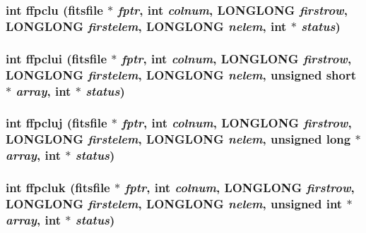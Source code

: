 \subsubsection{\setlength{\rightskip}{0pt plus 5cm}int ffpclu (\bf{fitsfile} $\ast$ {\em fptr}, int {\em colnum}, \bf{LONGLONG} {\em firstrow}, \bf{LONGLONG} {\em firstelem}, \bf{LONGLONG} {\em nelem}, int $\ast$ {\em status})}\label{test_2shm__client_2fitsio_8h_d0b72bec18b86400b6610d40ef80e0a4}


\subsubsection{\setlength{\rightskip}{0pt plus 5cm}int ffpclui (\bf{fitsfile} $\ast$ {\em fptr}, int {\em colnum}, \bf{LONGLONG} {\em firstrow}, \bf{LONGLONG} {\em firstelem}, \bf{LONGLONG} {\em nelem}, unsigned short $\ast$ {\em array}, int $\ast$ {\em status})}\label{test_2shm__client_2fitsio_8h_dbc957468fec6139e57ddb838f5782a7}


\subsubsection{\setlength{\rightskip}{0pt plus 5cm}int ffpcluj (\bf{fitsfile} $\ast$ {\em fptr}, int {\em colnum}, \bf{LONGLONG} {\em firstrow}, \bf{LONGLONG} {\em firstelem}, \bf{LONGLONG} {\em nelem}, unsigned long $\ast$ {\em array}, int $\ast$ {\em status})}\label{test_2shm__client_2fitsio_8h_93be7636ae678f27fed9c25ca171c009}


\subsubsection{\setlength{\rightskip}{0pt plus 5cm}int ffpcluk (\bf{fitsfile} $\ast$ {\em fptr}, int {\em colnum}, \bf{LONGLONG} {\em firstrow}, \bf{LONGLONG} {\em firstelem}, \bf{LONGLONG} {\em nelem}, unsigned int $\ast$ {\em array}, int $\ast$ {\em status})}\label{test_2shm__client_2fitsio_8h_b4d5611f33c75c133789ec5742f76240}



